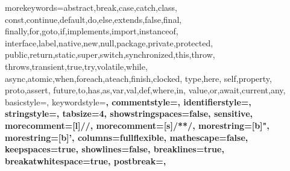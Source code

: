\usepackage{relsize}
\usepackage{turnstile}
\usepackage{amsmath}
\usepackage{url}

\usepackage{listings}

\usepackage{color}
%
%
  {morekeywords={abstract,break,case,catch,class,%
      const,continue,default,do,else,extends,false,final,%
      finally,for,goto,if,implements,import,instanceof,%
      interface,label,native,new,null,package,private,protected,%
      public,return,static,super,switch,synchronized,this,throw,%
      throws,transient,true,try,volatile,while,%
      async,atomic,when,foreach,ateach,finish,clocked,%
      type,here,%
      self,property,%
      proto,assert,%
      future,to,has,as,var,val,def,where,in,%
      value,or,await,current,any},%
   basicstyle=\normalfont\ttfamily,%
   keywordstyle=\bf\ttfamily,%
   commentstyle=\normalfont\ttfamily,%
   identifierstyle=\normalfont\ttfamily,%
   stringstyle=\normalfont\ttfamily,%
   tabsize=4,%
   showstringspaces=false,%
   sensitive,%
   morecomment=[l]//,%
   morecomment=[s]{/*}{*/},%
   morestring=[b]",%
   morestring=[b]',%
   columns=fullflexible,%
   mathescape=false,%
   keepspaces=true,%
   showlines=false,%
   breaklines=true,%
   breakatwhitespace=true,%
   postbreak={},%
  }

  {\lstset{language=X10,breaklines=false,captionpos=b,xleftmargin=2em,mathescape=true}}
  {}

  {\lstset{language=X10,breaklines=false,captionpos=b}} %
  {}

\lstset{language=x10,basicstyle=\ttfamily\small}


\usepackage[ruled]{algorithm} %
\usepackage[noend]{algorithmic} %
\renewcommand\algorithmiccomment[1]{// \textit{#1}} %


\usepackage{microtype}


\usepackage{pslatex}



\newcommand{\formalrule}[1]{\mbox{\textsc{\scriptsize #1}}}
\newcommand{\myrule}[2]{\textbf{Rule #1:} #2.}
\newcommand{\umyrule}[1]{\textbf{\underline{\textsc{\codesmaller #1 Rule}}}}


